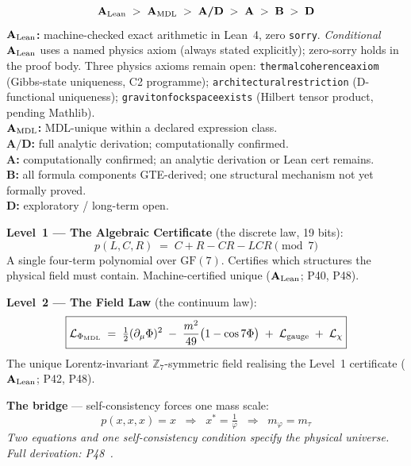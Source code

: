 \documentclass[11pt]{article}
\theoremstyle{remark}
\newcommand{\PHIMDL}{\Phi_{\mathrm{MDL}}}
\newcommand{\ZS}{\mathbb{Z}_7}
\newcommand{\lean}[1]{%
  \penalty-100
  \begingroup\def\_{\textunderscore\allowbreak}\texttt{#1}\endgroup}
\newcommand{\CatA}{\textbf{A}}
\newcommand{\CatAL}{\ensuremath{\textbf{A}_{\rm Lean}}}
\newcommand{\CatAMDL}{\ensuremath{\textbf{A}_{\rm MDL}}}
\newcommand{\CatAD}{\textbf{A/D}}
\newcommand{\CatB}{\textbf{B}}
\newcommand{\CatD}{\textbf{D}}
\begin{document}
\begin{tcolorbox}[colback=gray!4,colframe=gray!50!black,
  title={\textbf{Claim-strength taxonomy}},
  fonttitle=\bfseries,left=6pt,right=6pt,top=5pt,bottom=5pt]
\small
\[
\CatAL \;>\; \CatAMDL \;>\; \CatAD \;>\; \CatA \;>\; \CatB \;>\; \CatD
\]
\textbf{$\CatAL$:} machine-checked exact arithmetic in Lean~4, zero \texttt{sorry}.
  \emph{Conditional} $\CatAL$ uses a named physics axiom (always stated explicitly);
  zero-sorry holds in the proof body.
  Three physics axioms remain open: \lean{thermal\_coherence\_axiom}
  (Gibbs-state uniqueness, C2 programme); \lean{architectural\_restriction}
  (D-functional uniqueness); \lean{graviton\_fock\_space\_exists}
  (Hilbert tensor product, pending Mathlib).\\
\textbf{$\CatAMDL$:} MDL-unique within a declared expression class.\\
\textbf{$\CatAD$:} full analytic derivation; computationally confirmed.\\
\textbf{$\CatA$:} computationally confirmed; an analytic derivation or Lean cert remains.\\
\textbf{$\CatB$:} all formula components GTE-derived; one structural mechanism not yet formally proved.\\
\textbf{$\CatD$:} exploratory / long-term open.
\end{tcolorbox}

\begin{tcolorbox}[colback=green!4,colframe=green!55!black,
  title={\textbf{The Two Laws: One Framework, Two Levels}},
  fonttitle=\small\bfseries, left=8pt, right=8pt, top=6pt, bottom=6pt,
  breakable]
\small

\medskip\noindent
\textbf{Level~1 --- The Algebraic Certificate} (the discrete law, 19 bits):
\[
  \boxed{p(L,C,R) \;=\; C + R - CR - LCR \pmod{7}}
\]
A single four-term polynomial over $\mathrm{GF}(7)$.
Certifies which structures the physical field must contain.
Machine-certified unique (\CatAL; P40, P48).

\medskip\noindent
\textbf{Level~2 --- The Field Law} (the continuum law):
\[
  \boxed{\mathcal{L}_{\PHIMDL} \;=\; \tfrac{1}{2}(\partial_\mu\Phi)^2
    \;-\;\frac{m^2}{49}\bigl(1 - \cos 7\Phi\bigr)
    \;+\;\mathcal{L}_{\rm gauge}\;+\;\mathcal{L}_\chi}
\]
The unique Lorentz-invariant $\ZS$-symmetric field realising the
Level~1 certificate (\CatAL; P42, P48).

\medskip\noindent
\textbf{The bridge} --- self-consistency forces one mass scale:
\[
  \boxed{p(x,x,x) = x \;\;\Longrightarrow\;\; x^* = \tfrac{1}{\varphi}
    \;\;\Longrightarrow\;\; m_\varphi = m_\tau}
\]
\emph{Two equations and one self-consistency condition specify the physical universe.
Full derivation: P48~\cite{SpivackGTECompleteFramework}.}
\end{tcolorbox}
\end{document}
